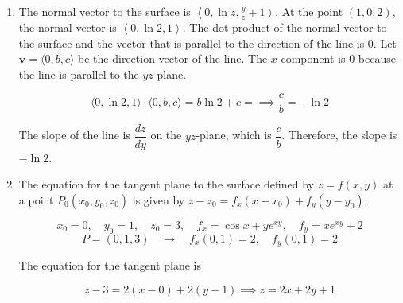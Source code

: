 \documentclass[a4paper, 12pt]{article}
\begin{document}
\begin{enumerate}[leftmargin=*,label=\textbf{\arabic*.}]
\begin{enumerate}[leftmargin=*,label=\textbf{\alph*.}]
\[dV=V_D\cdot dD+V_h\cdot dh\]

Calculate the partial derivatives.

\[V_D=\frac{\pi Dh}2,\quad V_h=\frac{\pi D^2}4\]

It is given $\left|dD\right|\leq0.5,\:|dh|\leq0.5,\:D=4,\:h=8$. The bounds for the propagated error in calculating the volume is

\[|dV|\leq\frac{\pi\cdot4\cdot8}2\cdot0.5+\frac{\pi\cdot4^2}4\cdot0.5=8\pi+2\pi=\boxed{10\pi\:\text{cm}^3}\]

\item The total differential of $S$ is

\[dS=S_D\cdot dD+S_h\cdot dh\]

Calculate the partial derivatives.

\[S_D=\pi h+\pi D,\quad S_h=\pi D\]

It is given $\left|dD\right|\leq0.5,\:|dh|\leq0.5,\:D=4,\:h=8$. The bounds for the propagated error in calculating the surface area is

\[|dS|=\pi\left(8+4\right)\cdot0.5+4\pi\cdot0.5=6\pi+2\pi=\boxed{8\pi\:\text{cm}^2}\]
\end{enumerate}

\item The normal vector to the surface is $\left\langle0,\ln z,\frac yz+1\right\rangle$. At the point $(1,0,2)$, the normal vector is $\left\langle0,\ln2,1\right\rangle$. The dot product of the normal vector to the surface and the vector that is parallel to the direction of the line is $0$. Let $\mathbf v=\langle 0,b,c\rangle$ be the direction vector of the line. The $x$-component is $0$ because the line is parallel to the $yz$-plane.

\[\langle0,\ln2,1\rangle\cdot\langle0,b,c\rangle=b\ln2+c=\implies \frac cb=-\ln2\]

The slope of the line is $\dfrac{dz}{dy}$ on the $yz$-plane, which is $\dfrac cb$. Therefore, the slope is $\boxed{-\ln2}$.

\item The equation for the tangent plane to the surface defined by $z=f(x,y)$ at a point $P_0(x_0,y_0,z_0)$ is given by $z-z_0=f_x(x-x_0)+f_y(y-y_0)$.

\[x_0=0,\quad y_0=1,\quad z_0=3,\quad f_x=\cos x+y{e}^{xy},\quad f_y=x{e}^{xy}+2\]
\[P=(0,1,3)\quad\rightarrow\quad f_x(0,1)=2,\quad f_y(0,1)=2\]

The equation for the tangent plane is

\[\boxed{z-3=2(x-0)+2(y-1)\implies z=2x+2y+1}\]

\end{enumerate}
\end{document}
